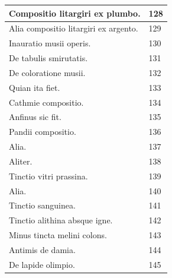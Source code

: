 \documentclass[a4paper, 11pt, oneside, polutonikogreek, italian]{article}
\begin{document}
\begin{center}
\begin{longtable}{|p{60mm}|l|}
         Compositio litargiri ex plumbo.                                                 & 128 \\ \hline
         Alia compositio litargiri ex argento.                                           & 129 \\ \hline
         Inauratio musii operis.                                                         & 130 \\ \hline
         De tabulis smirutatis.                                                          & 131 \\ \hline
         De coloratione musii.                                                           & 132 \\ \hline
         Quian ita fiet.                                                                 & 133 \\ \hline
         Cathmie compositio.                                                             & 134 \\ \hline
         Anfinus sic fit.                                                                & 135 \\ \hline
         Pandii compositio.                                                              & 136 \\ \hline
         Alia.                                                                           & 137 \\ \hline
         Aliter.                                                                         & 138 \\ \hline
         Tinctio vitri prassina.                                                         & 139 \\ \hline
         Alia.                                                                           & 140 \\ \hline
         Tinctio sanguinea.                                                              & 141 \\ \hline
         Tinctio alithina absque igne.                                                   & 142 \\ \hline
         Minus tincta melini colons.                                                     & 143 \\ \hline
         Antimis de damia.                                                               & 144 \\ \hline
         De lapide olimpio.                                                              & 145 \\ \hline

\end{longtable}
\end{center}
\end{document}
